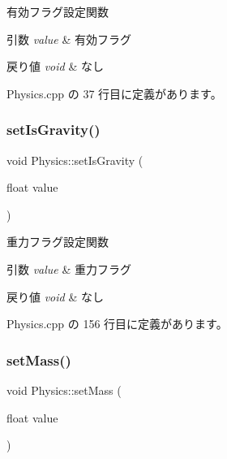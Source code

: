 有効フラグ設定関数 


\begin{DoxyParams}{引数}
{\em value} & 有効フラグ \\
\hline
\end{DoxyParams}

\begin{DoxyRetVals}{戻り値}
{\em void} & なし \\
\hline
\end{DoxyRetVals}


 Physics.\+cpp の 37 行目に定義があります。

\mbox{\label{class_physics_af5f8eac3abc26f0255b5ec7dc67c11db}} 
\subsubsection{\texorpdfstring{set\+Is\+Gravity()}{setIsGravity()}}
{\footnotesize\ttfamily void Physics\+::set\+Is\+Gravity (\begin{DoxyParamCaption}\item[{float}]{value }\end{DoxyParamCaption})}



重力フラグ設定関数 


\begin{DoxyParams}{引数}
{\em value} & 重力フラグ \\
\hline
\end{DoxyParams}

\begin{DoxyRetVals}{戻り値}
{\em void} & なし \\
\hline
\end{DoxyRetVals}


 Physics.\+cpp の 156 行目に定義があります。

\mbox{\label{class_physics_ab852c1bb08fcd4f364c2650cadfe1eda}} 
\subsubsection{\texorpdfstring{set\+Mass()}{setMass()}}
{\footnotesize\ttfamily void Physics\+::set\+Mass (\begin{DoxyParamCaption}\item[{float}]{value }\end{DoxyParamCaption})}



